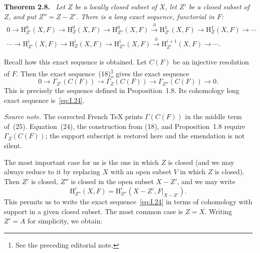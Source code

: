\documentclass[11pt]{article}
\newcommand{\restr}[2]{#1\vert_{#2}}
\newcommand{\srcpage}[1]{%
  \marginpar{\raggedright\scriptsize\color{rulegray}French printed p.~#1}}
\newenvironment{sgastatement}[1]
  {\par\addvspace{0.8\baselineskip}\noindent\textbf{#1.}\ \itshape}
  {\par\addvspace{0.4\baselineskip}}
\begin{document}
\begin{sgastatement}{Theorem 2.8}
Let $Z$ be a locally closed subset of $X$, let $Z'$ be a closed subset of
$Z$, and put $Z''=Z-Z'$. There is a long exact sequence, functorial in $F$:
\begin{equation}
\begin{gathered}
  0\longrightarrow \mathrm H_{Z'}^0(X,F)
  \longrightarrow \mathrm H_Z^0(X,F)
  \longrightarrow \mathrm H_{Z''}^0(X,F)
  \xrightarrow{\partial} \mathrm H_{Z'}^1(X,F)
  \longrightarrow \mathrm H_Z^1(X,F)\longrightarrow\cdots \\
  \cdots\longrightarrow \mathrm H_{Z'}^i(X,F)
  \longrightarrow \mathrm H_Z^i(X,F)
  \longrightarrow \mathrm H_{Z''}^i(X,F)
  \xrightarrow{\partial} \mathrm H_{Z'}^{i+1}(X,F)
  \longrightarrow\cdots .
\end{gathered}
\tag{24}\label{eq:I.24}
\end{equation}
\end{sgastatement}

Recall how this exact sequence is obtained. Let $C(F)$ be an injective
resolution of $F$. Then the exact sequence~(18)\footnote{See the preceding
editorial note.} gives the exact sequence
\begin{equation}
  0\longrightarrow\Gamma_{Z'}(C(F))
  \longrightarrow\Gamma_Z(C(F))
  \longrightarrow\Gamma_{Z''}(C(F))
  \longrightarrow0.
  \tag{25}\label{eq:I.25}
\end{equation}
This is precisely the sequence defined in Proposition~1.8. Its cohomology
long exact sequence is~\eqref{eq:I.24}.

\noindent\textit{Source note.} The corrected French TeX prints
$\Gamma(C(F))$ in the middle term of~(25). Equation~(24), the construction
from (18), and Proposition~1.8 require $\Gamma_Z(C(F))$; the support
subscript is restored here and the emendation is not silent.

The most important case for us is the one in which $Z$ is closed (and we may
always reduce to it by replacing $X$ with an open subset $V$ in which $Z$ is
closed). Then $Z'$ is closed, $Z''$ is closed in the open subset $X-Z'$, and
we may write
\begin{equation}
  \mathrm H_{Z''}^i(X,F)
  =\mathrm H_{Z''}^i(X-Z',\restr{F}{X-Z'}).
  \tag{26}\label{eq:I.26}
\end{equation}
This permits us to write the exact sequence~\eqref{eq:I.24} in terms of
cohomology with support\srcpage{16} in a given closed subset. The most common
case is $Z=X$. Writing $Z'=A$ for simplicity, we obtain:
\end{document}
